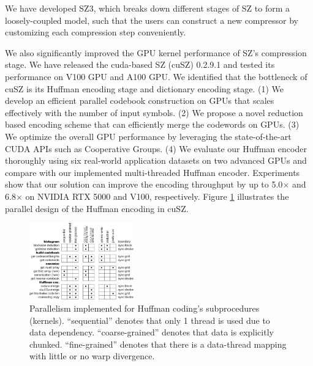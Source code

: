 We have developed SZ3, which breaks down different stages of SZ to form a loosely-coupled model, such that the users can construct a new compressor by customizing each compression step conveniently. %

We also significantly improved the GPU kernel performance of SZ's compression stage. We have released the cuda-based SZ (cuSZ) 0.2.9.1 and tested its performance on V100 GPU and A100 GPU. We identified that the bottleneck of cuSZ is its Huffman encoding stage and dictionary encoding stage. (1) We develop an efficient parallel codebook construction on GPUs that scales effectively with the number of input symbols. (2) We propose a novel reduction based encoding scheme that can efficiently merge the codewords on GPUs. (3) We optimize the overall GPU performance by leveraging the state-of-the-art CUDA APIs such as Cooperative Groups. (4) We evaluate our Huffman encoder thoroughly using six real-world application datasets on two advanced GPUs and compare with our implemented multi-threaded Huffman encoder. Experiments show that our solution can improve the encoding throughput by up to 5.0$\times$ and 6.8$\times$ on NVIDIA RTX 5000 and V100, respectively. Figure \ref{fig:sz-huffman} illustrates the parallel design of the Huffman encoding in cuSZ. 
\begin{figure}
  \includegraphics[width=0.4\textwidth]{projects/2.3.4-DataViz/2.3.4.14-VeloC-SZ/SZ-Huffman}
  \caption{Parallelism implemented for Huffman coding’s subprocedures (kernels).
``sequential” denotes that only 1 thread is used due to data dependency.
``coarse-grained” denotes that data is explicitly chunked. ``fine-grained” denotes
that there is a data-thread mapping with little or no warp divergence.}%
  \label{fig:sz-huffman}%
\end{figure}


